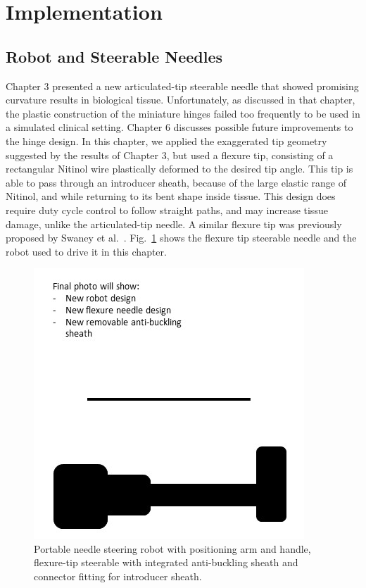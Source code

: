 \section{Implementation}
\label{sec:HumanInTheLoopImplementation}

\subsection{Robot and Steerable Needles}
\label{sec:NS2RobotAndNeedle}
Chapter 3 presented a new articulated-tip steerable needle that showed promising curvature results in biological tissue. Unfortunately, as discussed in that chapter, the plastic construction of the miniature hinges failed too frequently to be used in a simulated clinical setting. Chapter 6 discusses possible future improvements to the hinge design. In this chapter, we applied the exaggerated tip geometry suggested by the results of Chapter 3, but used a flexure tip, consisting of a rectangular Nitinol wire plastically deformed to the desired tip angle. This tip is able to pass through an introducer sheath, because of the large elastic range of Nitinol, and while returning to its bent shape inside tissue. This design does require duty cycle control to follow straight paths, and may increase tissue damage, unlike the articulated-tip needle. A similar flexure tip was previously proposed by Swaney et al.~\cite{Swaney2013}. Fig.~\ref{fig:NS2AndNeedle} shows the flexure tip steerable needle and the robot used to drive it in this chapter.

\begin{figure}[!ht]
\centering
\includegraphics[width = 0.4\columnwidth]{./Images/Chapter5/NS2RobotAndNeedle/DRAFTNS2RobotAndNeedle.jpg}%
\caption[Robot and flexure-tip steerable needles]{Portable needle steering robot with positioning arm and handle, flexure-tip steerable with integrated anti-buckling sheath and connector fitting for introducer sheath.}
\label{fig:NS2AndNeedle}
\end{figure}  

